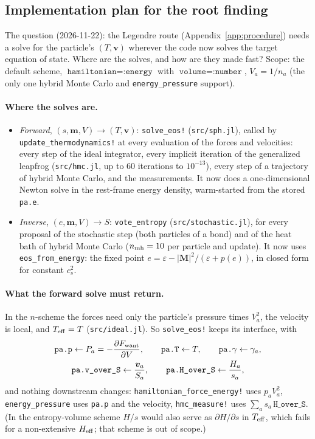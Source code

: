 \documentclass[11pt,aps,preprint,nofootinbib,superscriptaddress,tightenlines]{revtex4-2}
\def\st{\begin{equation}}
\def\stp{\end{equation}}
\def\App#1{Appendix~\ref{#1}}
\let\oldparagraph\paragraph
\renewcommand{\paragraph}{\par\bigskip\oldparagraph}
\begin{document}
\subsection{Implementation plan for the root finding}
\label{app:rootplan}
\begingroup\sloppy

The question (2026-11-22): the Legendre route (\App{app:procedure}) needs a solve for the particle's $(T,\bm v)$ wherever the code now solves the target equation of
state.  Where are the solves, and how are they made fast?  Scope: the default scheme, $\texttt{hamiltonian}=\texttt{:energy}$ with $\texttt{volume}=\texttt{:number}$,
$V_a=1/n_a$ (the only one hybrid Monte Carlo and \texttt{energy\_pressure} support).

\paragraph{Where the solves are.}
\begin{itemize}
\item \emph{Forward}, $(s,\bm m,V)\to(T,\bm v)$: \texttt{solve\_eos!} (\nolinkurl{src/sph.jl}), called by \texttt{update\_thermodynamics!} at every evaluation of the
  forces and velocities: every step of the ideal integrator, every implicit iteration of the generalized leapfrog (\nolinkurl{src/hmc.jl}, up to 60 iterations to
  $10^{-13}$), every step of a trajectory of hybrid Monte Carlo, and the measurements.  It now does a one-dimensional Newton solve in the rest-frame energy density,
  warm-started from the stored \texttt{pa.e}.
\item \emph{Inverse}, $(e,\bm m,V)\to S$: \texttt{vote\_entropy} (\nolinkurl{src/stochastic.jl}), for every proposal of the stochastic step (both particles of a bond)
  and of the heat bath of hybrid Monte Carlo ($n_{\rm mh}=10$ per particle and update).  It now uses \texttt{eos\_from\_energy}: the fixed point
  $e=\varepsilon-|\bm M|^2/(\varepsilon+p(e))$, in closed form for constant $c_s^2$.
\end{itemize}

\paragraph{What the forward solve must return.}  In the $n$-scheme the forces need only the particle's pressure times $V_a^2$, the velocity is local, and
$T_{\rm eff}=T$ (\nolinkurl{src/ideal.jl}).  So \texttt{solve\_eos!} keeps its interface, with
\st
\begin{gathered}
\texttt{pa.p}\leftarrow P_a=-\frac{\partial F_{\rm want}}{\partial V},\qquad \texttt{pa.T}\leftarrow T,\qquad \texttt{pa.}\gamma\leftarrow\gamma_a ,\\
\texttt{pa.v\_over\_S}\leftarrow\frac{\bm v_a}{S_a},\qquad \texttt{pa.H\_over\_S}\leftarrow\frac{H_a}{s_a} ,
\end{gathered}
\stp
and nothing downstream changes: \texttt{hamiltonian\_force\_energy!} uses $p_aV_a^2$, \texttt{energy\_pressure} uses \texttt{pa.p} and the velocity, \texttt{hmc\_measure!}
uses $\sum_as_a\,\texttt{H\_over\_S}$.  (In the entropy-volume scheme $H/s$ would also serve as $\partial H/\partial s$ in $T_{\rm eff}$, which fails for a non-extensive
$H_{\rm eff}$; that scheme is out of scope.)
\end{document}
